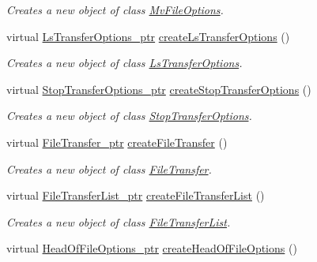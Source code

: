 \begin{DoxyCompactItemize}
\begin{DoxyCompactList}\small\item\em Creates a new object of class \hyperlink{classFMS__Data_1_1MvFileOptions}{MvFileOptions}. \item\end{DoxyCompactList}\item 
virtual \hyperlink{classFMS__Data_1_1LsTransferOptions}{LsTransferOptions\_\-ptr} \hyperlink{classFMS__Data_1_1FMS__DataFactory_a18662126b9e3beba8ef7e67792cd61e1}{createLsTransferOptions} ()
\begin{DoxyCompactList}\small\item\em Creates a new object of class \hyperlink{classFMS__Data_1_1LsTransferOptions}{LsTransferOptions}. \item\end{DoxyCompactList}\item 
virtual \hyperlink{classFMS__Data_1_1StopTransferOptions}{StopTransferOptions\_\-ptr} \hyperlink{classFMS__Data_1_1FMS__DataFactory_a975d7312d053e3966368c1933061aded}{createStopTransferOptions} ()
\begin{DoxyCompactList}\small\item\em Creates a new object of class \hyperlink{classFMS__Data_1_1StopTransferOptions}{StopTransferOptions}. \item\end{DoxyCompactList}\item 
virtual \hyperlink{classFMS__Data_1_1FileTransfer}{FileTransfer\_\-ptr} \hyperlink{classFMS__Data_1_1FMS__DataFactory_ab785189a6162203dad214fa72ecc7ef2}{createFileTransfer} ()
\begin{DoxyCompactList}\small\item\em Creates a new object of class \hyperlink{classFMS__Data_1_1FileTransfer}{FileTransfer}. \item\end{DoxyCompactList}\item 
virtual \hyperlink{classFMS__Data_1_1FileTransferList}{FileTransferList\_\-ptr} \hyperlink{classFMS__Data_1_1FMS__DataFactory_a956be9decf385c851110b226272d28ce}{createFileTransferList} ()
\begin{DoxyCompactList}\small\item\em Creates a new object of class \hyperlink{classFMS__Data_1_1FileTransferList}{FileTransferList}. \item\end{DoxyCompactList}\item 
virtual \hyperlink{classFMS__Data_1_1HeadOfFileOptions}{HeadOfFileOptions\_\-ptr} \hyperlink{classFMS__Data_1_1FMS__DataFactory_ad4a27c87b0e263ef5875977eb4980b6c}{createHeadOfFileOptions} ()

\end{DoxyCompactItemize}
